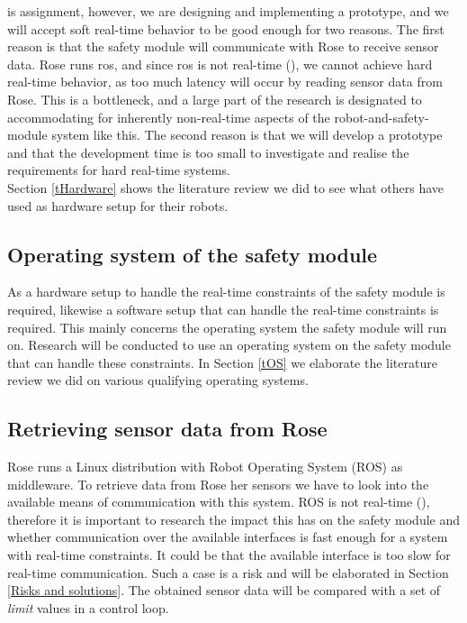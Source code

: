 \documentclass[12pt]{scrreprt}
\begin{document}
is assignment, however, we are designing and implementing a prototype, and we will accept soft real-time behavior to be good enough for two reasons. The first reason is that the safety module will communicate with Rose to receive sensor data. Rose runs \acrfull{ros}, and since \acrlong{ros} is not real-time (\cite{why_is_ros_not_realtime}), we cannot achieve hard real-time behavior, as too much latency will occur by reading sensor data from Rose. This is a bottleneck, and a large part of the research is designated to accommodating for inherently non-real-time aspects of the robot-and-safety-module system like this. The second reason is that we will develop a prototype and that the development time is too small to investigate and realise the requirements for hard real-time systems.
\\
Section \ref{tHardware} shows the literature review we did to see what others have used as hardware setup for their robots.



\subsection{Operating system of the safety module}
As a hardware setup to handle the real-time constraints of the safety module is required, likewise a software setup that can handle the real-time constraints is required. This mainly concerns the operating system the safety module will run on. Research will be conducted to use an operating system on the safety module that can handle these constraints. In Section \ref{tOS} we elaborate the literature review we did on various qualifying operating systems.


\subsection{Retrieving sensor data from Rose}
\label{Retrieving sensor data from Rose}
Rose runs a Linux distribution with Robot Operating System (ROS) as middleware. To retrieve data from Rose her sensors we have to look into the available means of communication with this system. ROS is not real-time (\cite{why_is_ros_not_realtime}), therefore it is important to research the impact this has on the safety module and whether communication over the available interfaces is fast enough for a system with real-time constraints. It could be that the available interface is too slow for real-time communication. Such a case is a risk and will be elaborated in Section \ref{Risks and solutions}. The obtained sensor data will be compared with a set of \textit{limit} values in a control loop.
\end{document}
